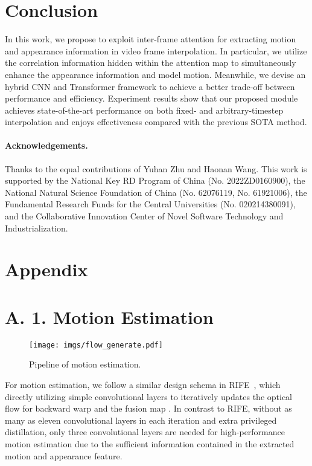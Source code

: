 \documentclass[10pt,twocolumn,letterpaper]{article}
\begin{document}
    \section{Conclusion}
    In this work, we propose to exploit inter-frame attention for extracting motion and appearance information in video frame interpolation. In particular, we utilize the correlation information hidden within the attention map to simultaneously enhance the appearance information and model motion. Meanwhile, we devise an hybrid CNN and Transformer framework to achieve a better trade-off between performance and efficiency. Experiment results show that our proposed module achieves state-of-the-art performance on both fixed- and arbitrary-timestep interpolation and enjoys effectiveness compared with the previous SOTA method.

    \paragraph {\bf Acknowledgements.} {\small Thanks to the equal contributions of Yuhan Zhu and Haonan Wang. This work is supported by the National Key RD Program of China (No. 2022ZD0160900), the National Natural Science Foundation of China (No. 62076119, No. 61921006), the Fundamental Research Funds for the Central Universities (No. 020214380091), and the Collaborative Innovation Center of Novel Software Technology and Industrialization.}

{\small


}
\clearpage

\section*{Appendix}

\section*{A. 1. Motion Estimation}
\begin{figure}[h]
		\centering
		\texttt{[image: imgs/flow\_generate.pdf]}
		\caption{Pipeline of motion estimation.}
		\label{fig:flow}
		\vspace{-0.15in}
\end{figure}

	For motion estimation, we follow a similar design schema in RIFE~\cite{huang2020rife}, which directly utilizing simple convolutional layers to iteratively updates the optical flow  for backward warp and the fusion map . In contrast to RIFE, without as many as eleven convolutional layers in each iteration and extra privileged distillation, only three convolutional layers are needed for high-performance motion estimation due to the sufficient information contained in the extracted motion and appearance feature. 
\end{document}
